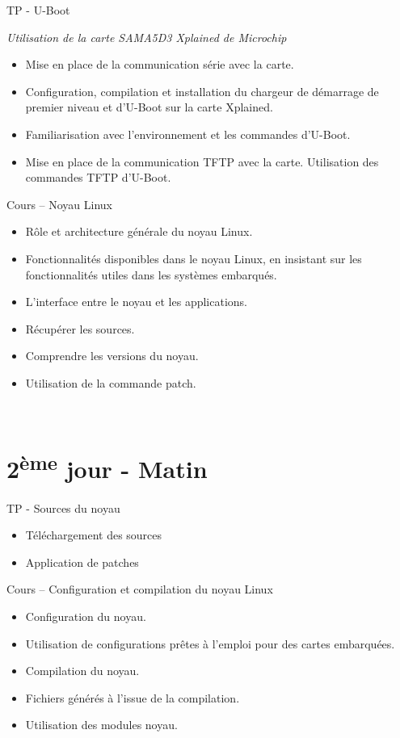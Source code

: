 \documentclass[a4paper,12pt,obeyspaces,spaces,hyphens]{article}
\begin{document}
\feagendatwocolumn
{TP - U-Boot}
{
  {\em Utilisation de la carte SAMA5D3 Xplained de Microchip}
  \begin{itemize}
  \item Mise en place de la communication série avec la carte.
  \item Configuration, compilation et installation du chargeur de
	démarrage de premier niveau et d'U-Boot sur la carte Xplained.
  \item Familiarisation avec l'environnement et les commandes d'U-Boot.
  \item Mise en place de la communication TFTP avec la carte.
	Utilisation des commandes TFTP d'U-Boot.
  \end{itemize}
}
{Cours – Noyau Linux}
{
  \begin{itemize}
  \item Rôle et architecture générale du noyau Linux.
  \item Fonctionnalités disponibles dans le noyau Linux, en insistant
	sur les fonctionnalités utiles dans les systèmes embarqués.
  \item L'interface entre le noyau et les applications.
  \item Récupérer les sources.
  \item Comprendre les versions du noyau.
  \item Utilisation de la commande patch.
  \end{itemize}
}
\\

\section{2\textsuperscript{ème} jour - Matin}

\feagendatwocolumn
{TP - Sources du noyau}
{
  \begin{itemize}
  \item Téléchargement des sources
  \item Application de patches
  \end{itemize}
}
{Cours – Configuration et compilation du noyau Linux}
{
  \begin{itemize}
  \item Configuration du noyau.
  \item Utilisation de configurations prêtes à l'emploi pour des cartes embarquées.
  \item Compilation du noyau.
  \item Fichiers générés à l'issue de la compilation.
  \item Utilisation des modules noyau.
  \end{itemize}
}
\end{document}
